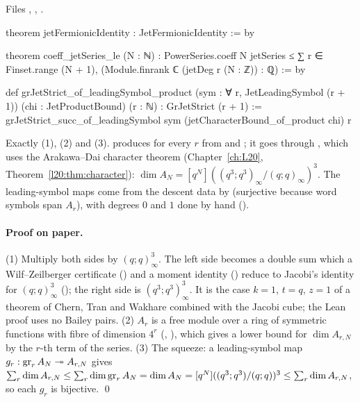 \noindent Files , ,
.
\begin{leancode}
theorem jetFermionicIdentity : JetFermionicIdentity := by

theorem coeff_jetSeries_le (N : ℕ) :
    PowerSeries.coeff N jetSeries ≤
      ∑ r ∈ Finset.range (N + 1), (Module.finrank ℂ (jetDeg r (N : ℤ)) : ℚ) := by

def grJetStrict_of_leadingSymbol_product (sym : ∀ r, JetLeadingSymbol (r + 1))
    (chi : JetProductBound) (r : ℕ) : GrJetStrict (r + 1) :=
  grJetStrict_succ_of_leadingSymbol sym (jetCharacterBound_of_product chi) r
\end{leancode}

\begin{dictionary}
Exactly (1), (2) and (3).  produces  for every $r$ from  and ;
it goes through , which uses the Arakawa--Dai character theorem 
(Chapter~\ref{ch:L20}, Theorem~\ref{l20:thm:character}): $\dim A_N=[q^N]((q^3;q^3)_\infty/(q;q)_\infty)^3$. The leading-symbol maps come from the descent data
by  (surjective because word symbols span $A_r$), with degrees $0$ and $1$ done by hand
().
\end{dictionary}

\paragraph{Proof on paper.} (1) Multiply both sides by $(q;q)_\infty^3$. The left side becomes a double sum which a Wilf--Zeilberger certificate
() and a moment identity () reduce to Jacobi's identity for $(q;q)_\infty^3$ (); the right side is
$(q^3;q^3)_\infty^3$. It is the case $k=1$, $t=q$, $z=1$ of a theorem of Chern, Tran and Wakhare combined with the Jacobi cube; the Lean proof uses no Bailey
pairs. (2) $A_r$ is a free module over a ring of symmetric functions with fibre of dimension $4^r$ (, ), which gives a lower
bound for $\dim A_{r,N}$ by the $r$-th term of the series. (3) The squeeze: a leading-symbol map $g_r:\operatorname{gr}_rA_N\twoheadrightarrow A_{r,N}$ gives
$\sum_r\dim A_{r,N}\le\sum_r\dim\operatorname{gr}_rA_N=\dim A_N=[q^N]((q^3;q^3)/(q;q))^3\le\sum_r\dim A_{r,N}$, so each $g_r$ is bijective. \qed


